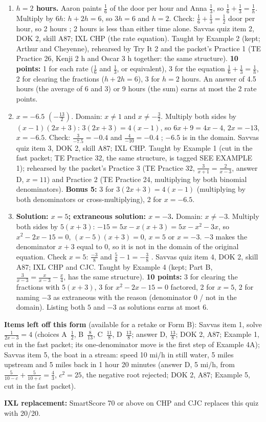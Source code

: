 \documentclass[11pt]{article}
\begin{document}
\begin{enumerate}
\item[\textbf{2.}] \textbf{$h=2$ hours.} Aaron paints $\tfrac16$ of the door per hour and Anna $\tfrac13$, so $\tfrac16+\tfrac13=\tfrac1h$. Multiply by $6h$: $h+2h=6$, so $3h=6$ and $h=2$. Check: $\tfrac16+\tfrac13=\tfrac12$ door per hour, so 2 hours \checkmark; 2 hours is less than either time alone. Savvas quiz item 2, DOK 2, skill A87; IXL CHP (the rate equation). Taught by Example 2 (kept; Arthur and Cheyenne), rehearsed by Try It 2 and the packet's Practice 1 (TE Practice 26, Kenji 2 h and Oscar 3 h together: the same structure). \textbf{10 points:} 1 for each rate ($\tfrac16$ and $\tfrac13$, or equivalent), 3 for the equation $\tfrac16+\tfrac13=\tfrac1h$, 2 for clearing the fractions ($h+2h=6$), 3 for $h=2$ hours. An answer of 4.5 hours (the average of 6 and 3) or 9 hours (the sum) earns at most the 2 rate points.
\item[\textbf{3.}] \textbf{$x=-6.5$} $\left(-\tfrac{13}{2}\right)$. Domain: $x\neq1$ and $x\neq-\tfrac32$. Multiply both sides by $(x-1)(2x+3)$: $3(2x+3)=4(x-1)$, so $6x+9=4x-4$, $2x=-13$, $x=-6.5$. Check: $\tfrac{3}{-7.5}=-0.4$ and $\tfrac{4}{-10}=-0.4$ \checkmark; $-6.5$ is in the domain. Savvas quiz item 3, DOK 2, skill A87; IXL CHP. Taught by Example 1 (cut in the fast packet; TE Practice 32, the same structure, is tagged SEE EXAMPLE 1); rehearsed by the packet's Practice 3 (TE Practice 32, $\tfrac{3}{x+1}=\tfrac{2}{x-3}$, answer D, $x=11$) and Practice 2 (TE Practice 24, multiplying by both binomial denominators). \textbf{Bonus 5:} 3 for $3(2x+3)=4(x-1)$ (multiplying by both denominators or cross-multiplying), 2 for $x=-6.5$.
\item[\textbf{4.}] \textbf{Solution: $x=5$; extraneous solution: $x=-3$.} Domain: $x\neq-3$. Multiply both sides by $5(x+3)$: $-15=5x-x(x+3)=5x-x^2-3x$, so $x^2-2x-15=0$, $(x-5)(x+3)=0$, $x=5$ or $x=-3$. $-3$ makes the denominator $x+3$ equal to 0, so it is not in the domain of the original equation. Check $x=5$: $\tfrac{-3}{8}$ and $\tfrac58-1=-\tfrac38$ \checkmark. Savvas quiz item 4, DOK 2, skill A87; IXL CHP and CJC. Taught by Example 4 (kept; Part B, $\tfrac{3}{x-3}=\tfrac{x}{x-3}-\tfrac{x}{4}$, has the same structure). \textbf{10 points:} 3 for clearing the fractions with $5(x+3)$, 3 for $x^2-2x-15=0$ factored, 2 for $x=5$, 2 for naming $-3$ as extraneous with the reason (denominator 0 / not in the domain). Listing both $5$ and $-3$ as solutions earns at most 6.
\end{enumerate}

\textbf{Items left off this form} (available for a retake or Form B): Savvas item 1, solve $\frac{1}{2x-3}=4$ (choices A~$\frac12$, B~$\frac{8}{13}$, C~$\frac{11}{8}$, D~$\frac{13}{8}$; answer D, $\tfrac{13}{8}$; DOK 2, A87; Example 1, cut in the fast packet; its one-denominator move is the first step of Example 4A); Savvas item 5, the boat in a stream: speed 10 mi/h in still water, 5 miles upstream and 5 miles back in 1 hour 20 minutes (answer D, 5 mi/h, from $\tfrac{5}{10-c}+\tfrac{5}{10+c}=\tfrac43$, $c^2=25$, the negative root rejected; DOK 2, A87; Example 5, cut in the fast packet).

\textbf{IXL replacement:} SmartScore 70 or above on CHP and CJC replaces this quiz with 20/20.
\end{document}
